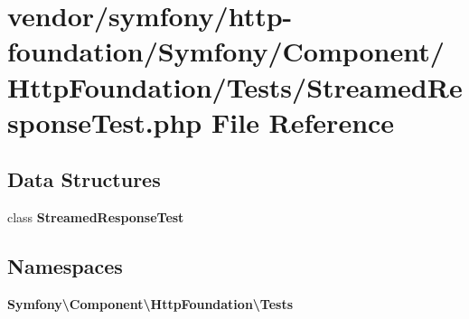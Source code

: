 \section{vendor/symfony/http-\/foundation/\+Symfony/\+Component/\+Http\+Foundation/\+Tests/\+Streamed\+Response\+Test.php File Reference}
\label{_streamed_response_test_8php}
\subsection*{Data Structures}
\begin{DoxyCompactItemize}
\item 
class {\bf Streamed\+Response\+Test}
\end{DoxyCompactItemize}
\subsection*{Namespaces}
\begin{DoxyCompactItemize}
\item 
 {\bf Symfony\textbackslash{}\+Component\textbackslash{}\+Http\+Foundation\textbackslash{}\+Tests}
\end{DoxyCompactItemize}
